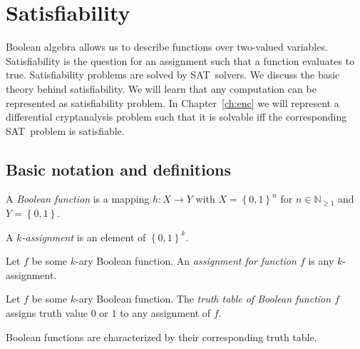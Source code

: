 \renewcommand*\chappic{img/satisfiability.pdf}
\renewcommand*\chapquote{What idiot called them logic errors rather than bool shit?}
\renewcommand*\chapquotesrc{Unknown}
\chapter{Satisfiability}
\label{ch:sat}

Boolean algebra allows us to describe functions over two-valued variables.
Satisfiability is the question for an assignment such that a function
evaluates to true. Satisfiability problems are solved by SAT~solvers.
We discuss the basic theory behind satisfiability. We will learn that any
computation can be represented as satisfiability problem. In Chapter~\ref{ch:enc}
we will represent a differential cryptanalysis problem such that it is
solvable iff the corresponding SAT~problem is satisfiable.

\section{Basic notation and definitions}
\label{sec:sat-intro}
%
\begin{defi}
  A \emph{Boolean function} is a mapping $h: X \to Y$ with $X = \left\{0,1\right\}^n$
  for $n \in \mathbb N_{\geq 1}$ and $Y = \left\{0,1\right\}$.
\end{defi}

\begin{defi}[Assignment]
  A \emph{$k$-assignment} is an element of $\left\{0,1\right\}^k$.

  \noindent
  Let $f$ be some $k$-ary Boolean function.
  An \emph{assignment for function $f$} is any $k$-assignment.
\end{defi}

\begin{defi}
  Let $f$ be some $k$-ary Boolean function.
  The \emph{truth table of Boolean function $f$} assigns
  truth value $0$ or $1$ to any assignment of $f$.
\end{defi}

Boolean functions are characterized by their corresponding truth table.

